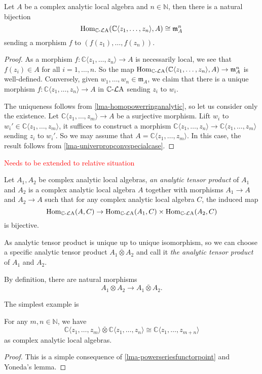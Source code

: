 \begin{lemma}\label{lma-powerseriesfunctorpoint}
    Let $A$ be a complex analytic local algebra and $n\in \mathbb{N}$, then there is a natural bijection
    \[
        \operatorname{Hom}_{\mathbb{C}\text{-}\mathcal{L}\mathrm{A}}(\mathbb{C}\langle z_1,\ldots,z_n \rangle,A)\cong \mathfrak{m}_{A}^n
    \]
    sending a morphism $f$ to $(f(z_1),\ldots,f(z_n))$.
\end{lemma}
\begin{proof}
    As a morphism $f:\mathbb{C}\langle z_1,\ldots,z_n \rangle \rightarrow A$ is necessarily local, we see that $f(z_i)\in A$ for all $i=1,\ldots,n$. So the map $\operatorname{Hom}_{\mathbb{C}\text{-}\mathcal{L}\mathrm{A}}(\mathbb{C}\langle z_1,\ldots,z_n \rangle,A)\rightarrow \mathfrak{m}_{A}^n$ is well-defined. Conversely, given $w_1,\ldots,w_n\in \mathfrak{m}_A$, we claim that there is a unique morphism $f:\mathbb{C}\langle z_1,\ldots,z_n \rangle \rightarrow A$ in $\mathbb{C}\text{-}\mathcal{L}\mathrm{A}$ sending $z_i$ to $w_i$.

    The uniqueness follows from \cref{lma-homopowerringanalytic}, so let us consider only the existence.
    Let $\mathbb{C}\langle z_1,\ldots,z_m \rangle \rightarrow A$ be a surjective morphism. Lift $w_i$ to $w_i'\in \mathbb{C}\langle z_1,\ldots,z_m \rangle$, it suffices to construct a morphism $\mathbb{C}\langle z_1,\ldots,z_n \rangle\rightarrow \mathbb{C}\langle z_1,\ldots,z_m \rangle$ sending $z_i$ to $w_i'$. So we may assume that $A=\mathbb{C}\langle z_1,\ldots,z_m \rangle$. In this case, the result follows from \cref{lma-univerpropconvspecialcase}.
\end{proof}

\textcolor{red}{Needs to be extended to relative situation}
\begin{definition}
    Let $A_1,A_2$ be complex analytic local algebras, \emph{an analytic tensor product} of $A_1$ and $A_2$ is a complex analytic local algebra $A$ together with morphisms $A_1\rightarrow A$ and $A_2\rightarrow A$ such that for any complex analytic local algebra $C$, the induced map
    \[
      \operatorname{Hom}_{\mathbb{C}\text{-}\mathcal{L}\mathrm{A}}(A,C)\rightarrow  \operatorname{Hom}_{\mathbb{C}\text{-}\mathcal{L}\mathrm{A}}(A_1,C)\times  \operatorname{Hom}_{\mathbb{C}\text{-}\mathcal{L}\mathrm{A}}(A_2,C)
    \]
    is bijective.

    As analytic tensor product is unique up to unique isomorphism, so we can choose a specific analytic tensor product $A_1\overline{\otimes} A_2$ and call it \emph{the analytic tensor product} of $A_1$ and $A_2$.
\end{definition}
By definition, there are natural morphisms 
\[
    A_1\otimes A_2\rightarrow A_1\overline{\otimes} A_2.
\]

The simplest example is 
\begin{lemma}\label{lma-Cmexistencetensor}
    For any $m,n\in \mathbb{N}$, we have
    \[
        \mathbb{C}\langle z_1,\ldots,z_m \rangle\overline{\otimes} \mathbb{C}\langle z_1,\ldots,z_n \rangle\cong  \mathbb{C}\langle z_1,\ldots,z_{m+n} \rangle
    \]
    as complex analytic local algebras.
\end{lemma}
\begin{proof}
    This is a simple consequence of \cref{lma-powerseriesfunctorpoint} and Yoneda's lemma.    
\end{proof}

